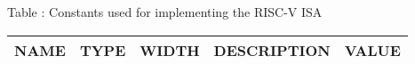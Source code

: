 {
  \vspace{0.5em}
  \begin{center}
    Table \thetable: Constants used for implementing the RISC-V ISA\label{tab:riscv-constants}
  \end{center}

\footnotesize
\begin{xltabular}{0.9\textwidth}{|l|c|c|X|r|}
  \hline
  \textbf{NAME} & \textbf{TYPE} & \textbf{WIDTH} & \textbf{DESCRIPTION} & \textbf{VALUE} \\
  \hline
  \hline
\end{xltabular}
}
